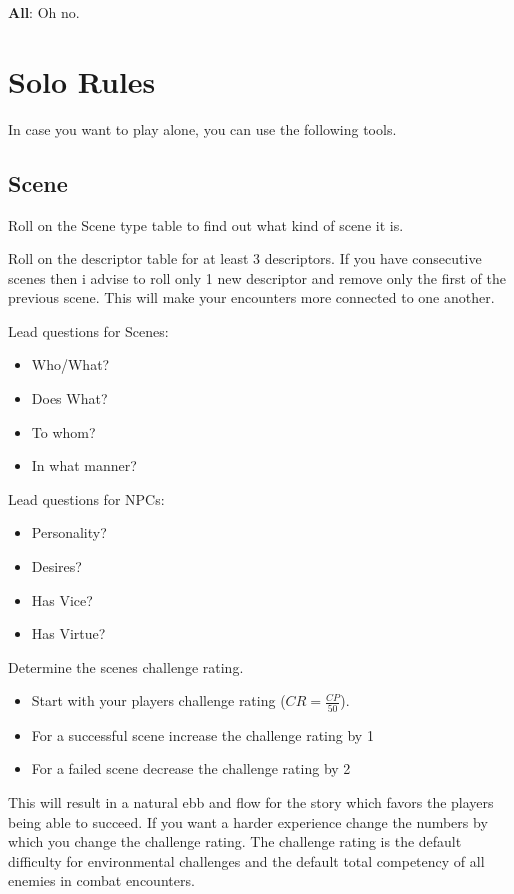 \documentclass[11pt]{article}
\begin{document}
{\textbf{All}: Oh no.


\newpage
\section{Solo Rules}
\label{sec:org6141936}
In case you want to play alone, you can use the following tools.
\subsection{Scene}
\label{sec:org5d8e3e5}
Roll on the Scene type table to find out what kind of scene it is.

Roll on the descriptor table for at least 3 descriptors. If you have consecutive scenes then i advise to roll only 1 new descriptor and remove only the first of the previous scene. This will make your encounters more connected to one another.

\begin{multicols}{2}
Lead questions for Scenes: 
\begin{itemize}
\item Who/What?
\item Does What?
\item To whom?
\item In what manner?
\end{itemize}
\columnbreak
Lead questions for NPCs:
\begin{itemize}
\item Personality?
\item Desires?
\item Has Vice?
\item Has Virtue?
\end{itemize}
\end{multicols}

Determine the scenes challenge rating.
\begin{itemize}
\item Start with your players challenge rating (\(CR = \frac{CP}{50}\)).
\item For a successful scene increase the challenge rating by 1
\item For a failed scene decrease the challenge rating by 2
\end{itemize}

This will result in a natural ebb and flow for the story which favors the players being able to succeed. If you want a harder experience change the numbers by which you change the challenge rating. 
The challenge rating is the default difficulty for environmental challenges and the default total competency of all enemies in combat encounters.

}
\end{document}
